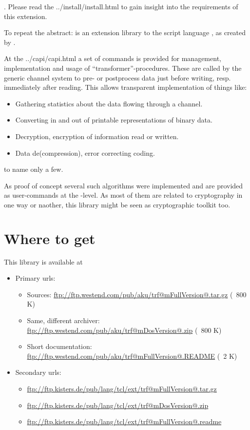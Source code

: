 \documentclass {report}
\def\installman{\htmladdnormallink {installation manual} {../install/install.html}}
\def\capi{      \htmladdnormallink {C-level} {../capi/capi.html}}
\begin{document}
. Please read
the \installman{} to gain insight into the requirements of this
extension.

To repeat the abstract: \trf {} is an extension library to the script
language \tcl, as created by \jo.

At the \capi{} a set of commands is provided for management,
implementation and usage of ``transformer''-procedures. These are
called by the generic channel system to pre- or postprocess data just
before writing, resp. immediately after reading. This allows
transparent implementation of things like:

\begin {itemize}
\item	Gathering statistics about the data flowing through a channel.
\item	Converting in and out of printable representations of binary
	data.
\item	Decryption, encryption of information read or written.
\item	Data de(compression), error correcting coding.
\end   {itemize}
to name only a few.

As proof of concept several such algorithms were implemented and are
provided as user-commands at the \tcl{}-level. As most of them are
related to cryptography in one way or naother, this library might be
seen as cryptographic toolkit too.


\chapter {Where to get}

This library is available at
\begin {itemize}
\item[] Primary urls:
\begin {itemize}
\item[Sources:] \url {ftp://ftp.westend.com/pub/aku/trf@mFullVersion@.tar.gz} (~800 K)
\item[Same, different archiver:] \url {ftp://ftp.westend.com/pub/aku/trf@mDosVersion@.zip} (~800 K)
\item[Short documentation:] \url {ftp://ftp.westend.com/pub/aku/trf@mFullVersion@.README} (~2 K)
\end {itemize}

\item[] Secondary urls:
\begin {itemize}
\item \url {ftp://ftp.kisters.de/pub/lang/tcl/ext/trf@mFullVersion@.tar.gz}
\item \url {ftp://ftp.kisters.de/pub/lang/tcl/ext/trf@mDosVersion@.zip}
\item \url {ftp://ftp.kisters.de/pub/lang/tcl/ext/trf@mFullVersion@.readme}
\end {itemize}
\end {itemize}
\end{document}
